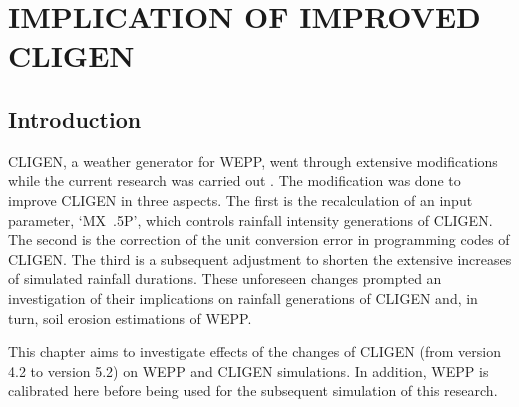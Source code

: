 \chapter{IMPLICATION OF IMPROVED CLIGEN}
\label{sec:IMPLICATIONSOFIMPROVEDCLIGEN}

\section{Introduction}
\label{sec:ImprovedCligenIntroduction}
CLIGEN, a weather generator for WEPP, went through extensive modifications while
the current research was carried out \citep{yu2000-301}. The modification was
done to improve CLIGEN in three aspects. The first is the recalculation of an
input parameter, `MX~.5P', which controls rainfall intensity generations of
CLIGEN. The second is the correction of the unit conversion error in programming
codes of CLIGEN. The third is a subsequent adjustment to shorten the extensive
increases of simulated rainfall durations. These unforeseen changes prompted an
investigation of their implications on rainfall generations of CLIGEN and, in
turn, soil erosion estimations of WEPP.

This chapter aims to investigate effects of the changes of CLIGEN (from version
4.2 to version 5.2) on WEPP and CLIGEN simulations. In addition, WEPP is
calibrated here before being used for the subsequent simulation of this
research.

